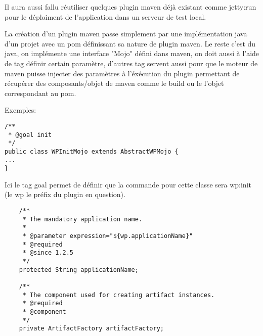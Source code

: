 Il aura aussi fallu réutiliser quelques plugin maven déjà existant comme jetty:run
pour le déploiment de l'application dans un serveur de test local. 

La création d'un plugin maven passe simplement par une implémentation java d'un
projet avec un pom définissant sa nature de plugin maven. Le reste c'est du java,
on implémente une interface "Mojo" défini dans maven, on doit aussi à l'aide de 
tag définir certain paramètre, d'autres tag servent aussi pour que le moteur
de maven puisse injecter des paramètres à l'éxécution du plugin permettant de
récupérer des composants/objet de maven comme le build ou le l'objet correspondant
au pom.


Exemples:

\begin{lstlisting}
/**
 * @goal init
 */
public class WPInitMojo extends AbstractWPMojo {
...
}
\end{lstlisting}

Ici le tag goal permet de définir que la commande pour cette classe sera wp:init
(le wp le préfix du plugin en question). 

\begin{lstlisting}
    /**
     * The mandatory application name.
     *
     * @parameter expression="${wp.applicationName}"
     * @required
     * @since 1.2.5
     */
    protected String applicationName;

    /**
     * The component used for creating artifact instances.
     * @required
     * @component
     */
    private ArtifactFactory artifactFactory;

\end{lstlisting}


